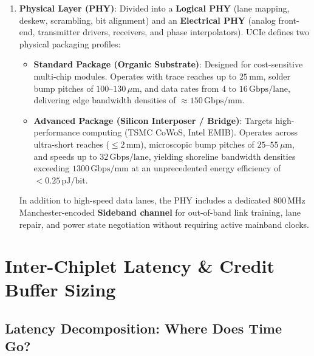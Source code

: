 \begin{enumerate}
    \item \textbf{Physical Layer (PHY)}: Divided into a \textbf{Logical PHY} (lane mapping, deskew, scrambling, bit alignment) and an \textbf{Electrical PHY} (analog front-end, transmitter drivers, receivers, and phase interpolators). UCIe defines two physical packaging profiles:
    \begin{itemize}
        \item \textbf{Standard Package (Organic Substrate)}: Designed for cost-sensitive multi-chip modules. Operates with trace reaches up to $25\,\mathrm{mm}$, solder bump pitches of $100\text{--}130\,\mu\mathrm{m}$, and data rates from $4\text{ to }16\,\mathrm{Gbps/lane}$, delivering edge bandwidth densities of $\approx 150\,\mathrm{Gbps/mm}$.
        \item \textbf{Advanced Package (Silicon Interposer / Bridge)}: Targets high-performance computing (TSMC CoWoS, Intel EMIB). Operates across ultra-short reaches ($\le 2\,\mathrm{mm}$), microscopic bump pitches of $25\text{--}55\,\mu\mathrm{m}$, and speeds up to $32\,\mathrm{Gbps/lane}$, yielding shoreline bandwidth densities exceeding \textbf{$1300\,\mathrm{Gbps/mm}$} at an unprecedented energy efficiency of \textbf{$< 0.25\,\mathrm{pJ/bit}$}.
    \end{itemize}
    In addition to high-speed data lanes, the PHY includes a dedicated $800\,\mathrm{MHz}$ Manchester-encoded \textbf{Sideband channel} for out-of-band link training, lane repair, and power state negotiation without requiring active mainband clocks.
\end{enumerate}

\section{Inter-Chiplet Latency \& Credit Buffer Sizing}
\label{sec:d2d-latency-credit}

\subsection{Latency Decomposition: Where Does Time Go?}

